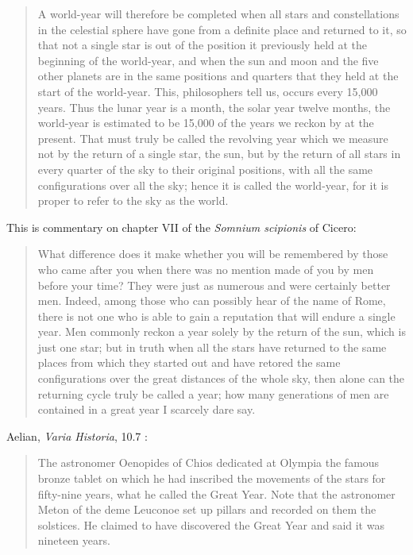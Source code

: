 \documentclass{amsart}
\theoremstyle{definition}
\begin{document}
\begin{quote}
A world-year will therefore be completed when all stars and constellations in the celestial sphere have gone from a definite place and returned to it, so that
not a single star is out of the position it previously held at the beginning of the world-year, and when the sun and moon and the five other planets are in the same positions
and quarters that they held at the start of the world-year. This, philosophers tell us, occurs every 15,000 years. Thus the lunar year is a month, the solar year twelve
months, the world-year is estimated to be 15,000 of the years we reckon by at the present. That must truly be called the revolving year which we measure
not by the return of a single star, the sun, but by the return of all stars in every quarter of the sky to their original positions, with all
the same configurations over all the sky; hence it is called the world-year, for it is proper to refer to the sky as the world.
\end{quote}

This is commentary on chapter VII of the {\em Somnium scipionis} of Cicero:

\begin{quote}
What difference does it make whether you will be remembered by those who came after you when there was no mention made of you by men
before your time? They were just as numerous and were certainly better men. Indeed, among those who can possibly hear of the name of Rome,
there is not one who is able to gain a reputation that will endure a single year. Men commonly reckon a year solely by the return of the sun, which is just one star;
but in truth when all the stars have returned to the same places from which they started out and have retored the same configurations over the great distances
of the whole sky, then alone can the returning cycle truly be called a year; how many generations of men are contained in a great year I scarcely dare say.
\end{quote}

Aelian, {\em Varia Historia}, 10.7 \cite[p.~319]{aelian}:

\begin{quote}
The astronomer Oenopides of Chios dedicated at Olympia
the famous bronze tablet on which he had inscribed the movements
of the stars for fifty-nine years, what he called the Great Year.
Note that the astronomer Meton of the deme Leuconoe set up
pillars and recorded on them the solstices. He claimed to have discovered
the Great Year and said it was nineteen years.
\end{quote}
\end{document}
